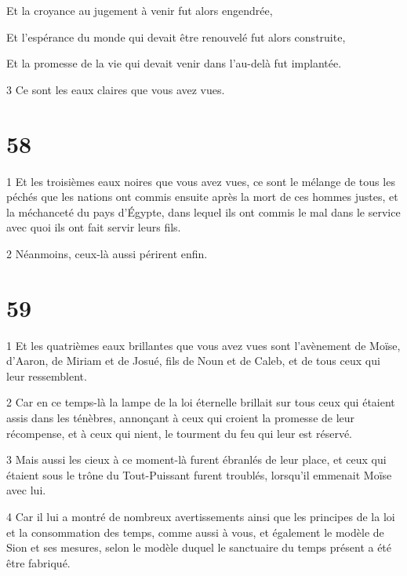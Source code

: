 \par Et la croyance au jugement à venir fut alors engendrée,

\par Et l'espérance du monde qui devait être renouvelé fut alors construite,

\par Et la promesse de la vie qui devait venir dans l'au-delà fut implantée.

\par 3 Ce sont les eaux claires que vous avez vues.

\chapter{58}

\par 1 Et les troisièmes eaux noires que vous avez vues, ce sont le mélange de tous les péchés que les nations ont commis ensuite après la mort de ces hommes justes, et la méchanceté du pays d'Égypte, dans lequel ils ont commis le mal dans le service avec quoi ils ont fait servir leurs fils.

\par 2 Néanmoins, ceux-là aussi périrent enfin.

\chapter{59}

\par 1 Et les quatrièmes eaux brillantes que vous avez vues sont l'avènement de Moïse, d'Aaron, de Miriam et de Josué, fils de Noun et de Caleb, et de tous ceux qui leur ressemblent.

\par 2 Car en ce temps-là la lampe de la loi éternelle brillait sur tous ceux qui étaient assis dans les ténèbres, annonçant à ceux qui croient la promesse de leur récompense, et à ceux qui nient, le tourment du feu qui leur est réservé.

\par 3 Mais aussi les cieux à ce moment-là furent ébranlés de leur place, et ceux qui étaient sous le trône du Tout-Puissant furent troublés, lorsqu'il emmenait Moïse avec lui.

\par 4 Car il lui a montré de nombreux avertissements ainsi que les principes de la loi et la consommation des temps, comme aussi à vous, et également le modèle de Sion et ses mesures, selon le modèle duquel le sanctuaire du temps présent a été être fabriqué.

